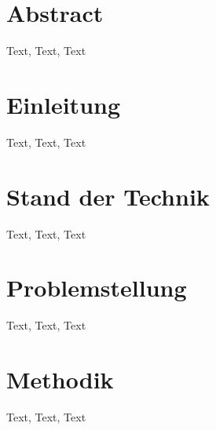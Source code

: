 \documentclass[captions=tableheading, listof=leveldown, 11pt]{scrartcl}
\begin{document}
\section*{Abstract}
%
{Text, Text, Text}

\newpage
{}
\tableofcontents
\newpage
%
\section{Einleitung}
%
{Text, Text, Text}
\newpage
\section{Stand der Technik}
%
Text, Text, Text
\newpage
\section{Problemstellung}
%
Text, Text, Text
\newpage
\section{Methodik}
%
Text, Text, Text
\newpage
\end{document}
